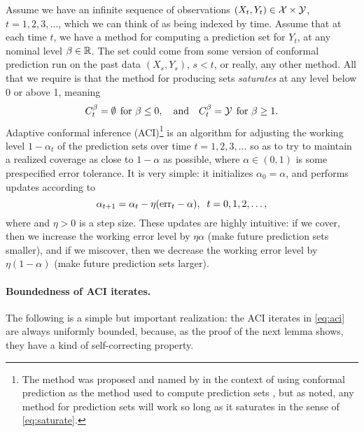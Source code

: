 \documentclass{article}
\begin{document}
Assume we have an infinite sequence of observations $(X_t,Y_t) \in \mathcal{X} \times
\mathcal{Y}$, $t=1,2,3,\ldots$, which we can think of as being indexed by time. Assume
that at each time $t$, we have a method for computing a prediction set
 for $Y_t$, at any nominal level $\beta \in
\mathbb{R}$. The set  could come from some version of conformal 
prediction run on the past data $(X_s,Y_s)$, $s<t$, or really, any other
method. All that we require is that the method for producing sets
\emph{saturates} at any level below 0 or above 1, meaning  
\begin{equation}
\label{eq:saturate}
C_t^\beta = \emptyset \;\, \text{for $\beta \leq 0$}, \quad \text{and} \quad 
C_t^\beta = \mathcal{Y} \;\, \text{for $\beta \geq 1$}.
\end{equation}
Adaptive conformal inference (ACI)\footnote{The method was proposed and named by
  \citet{gibbs2021adaptive} in the context of using conformal prediction as the
  method used to compute prediction sets , but as noted, any
  method for prediction sets will work so long as it saturates in the sense of
  \eqref{eq:saturate}.}  
is an algorithm for adjusting the working level $1-\alpha_t$ of the prediction 
sets over time $t=1,2,3,\ldots$ so as to try to maintain a realized coverage as
close to $1-\alpha$ as possible, where $\alpha \in (0,1)$ is some prespecified
error tolerance. It is very simple: it initializes $\alpha_0 = \alpha$, and
performs updates according to    
\begin{equation}
\label{eq:aci}
\alpha_{t+1} = \alpha_t - \eta (\mathrm{err}_t - \alpha), \;\; t=0,1,2,\ldots,
\end{equation}
where  and $\eta>0$ is a
step size. These updates are highly intuitive: if we cover, then we increase the
working error level by $\eta \alpha$ (make future prediction sets smaller), and
if we miscover, then we decrease the working error level by $\eta (1-\alpha)$
(make future prediction sets larger).

\paragraph{Boundedness of ACI iterates.}

The following is a simple but important realization: the ACI iterates in
\eqref{eq:aci} are always uniformly bounded, because, as the proof of the next
lemma shows, they have a kind of self-correcting property.  
\end{document}
